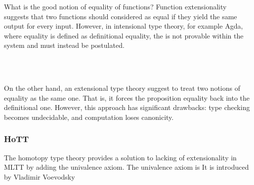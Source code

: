 What is the good notion of equality of functions? Function extensionality suggests that two functions should considered as equal if they yield the same output for every input. However, in intensional type theory, for example Agda, where equality is defined as definitional equality, the  is not provable within the system and must instead be postulated.

\begin{code}%
\>[0]\<%
\\
\>[0][@{}l@{\AgdaIndent{0}}]%
\>[2]\AgdaSpace{}%
\AgdaSymbol{:}%
\>[103I]\AgdaSymbol{\{}\AgdaSpace{}%
\AgdaSymbol{:}\AgdaSpace{}%
\AgdaSymbol{\}}\AgdaSpace{}%
\AgdaSymbol{\{}\AgdaSpace{}%
\AgdaSymbol{:}\AgdaSpace{}%
\AgdaSpace{}%
\AgdaSpace{}%
\AgdaSymbol{\}}\AgdaSpace{}%
\AgdaSymbol{\{}\AgdaSpace{}%
\AgdaSpace{}%
\AgdaSymbol{:}\AgdaSpace{}%
\AgdaSymbol{(}\AgdaSpace{}%
\AgdaSymbol{:}\AgdaSpace{}%
\AgdaSymbol{)}\AgdaSpace{}%
\AgdaSpace{}%
\AgdaSpace{}%
\AgdaSymbol{\}}\AgdaSpace{}%
\<%
\\
\>[.][@{}l@{}]\<[103I]%
\>[11]\AgdaSymbol{((}\AgdaSpace{}%
\AgdaSymbol{:}\AgdaSpace{}%
\AgdaSymbol{)}\AgdaSpace{}%
\AgdaSpace{}%
\AgdaSpace{}%
\AgdaSpace{}%
\AgdaSpace{}%
\AgdaSpace{}%
\AgdaSymbol{)}\AgdaSpace{}%
\AgdaSpace{}%
\AgdaSpace{}%
\AgdaSpace{}%
\<%
\end{code}

On the other hand, an extensional type theory suggest to treat two notions of equality as the same one. That is, it forces the proposition equality back into the definitional one. However, this approach has significant drawbacks: type checking becomes undecidable, and computation loses canonicity.

\subsubsection*{HoTT}

The homotopy type theory provides a solution to lacking of extensionality in MLTT by adding the univalence axiom. The univalence axiom is It is introduced by Vladimir Voevodsky